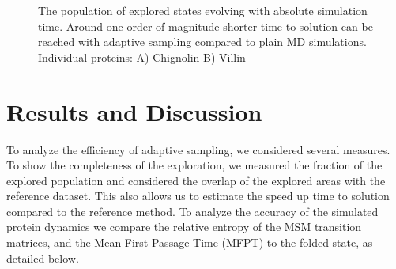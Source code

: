 \begin{figure}[h!]
   \begin{subfigure}[b]{0.8\linewidth}
   {}
   \end{subfigure}%
   
   \begin{subfigure}[b]{0.8\linewidth}
   {}
   \end{subfigure}%


  \caption{The population of explored states evolving with absolute simulation time.  Around one
  order of magnitude shorter time to solution can be reached with adaptive
  sampling compared to plain MD simulations.  Individual proteins: A) Chignolin B) Villin }
\end{figure}

\begin{figure}[h!]\ContinuedFloat
   \begin{subfigure}[b]{0.8\linewidth}
   {}
    \end{subfigure}%

   \begin{subfigure}[b]{0.8\linewidth}
   {}
    \end{subfigure}%
  \caption{
   }
  \label{fig:Pop_explored}
\end{figure}
\section{\label{sec:results}Results and Discussion}

To analyze the efficiency of adaptive sampling, we considered several
measures. To show the completeness of the exploration, we measured the fraction
of the explored population and considered the overlap of the explored areas with the
reference dataset. This also allows us to estimate the speed up time to solution
compared to the reference method. To analyze the accuracy of the simulated
protein dynamics we compare the relative entropy of the MSM transition
matrices, and the Mean First Passage Time (MFPT) to the folded state, as
detailed below.


